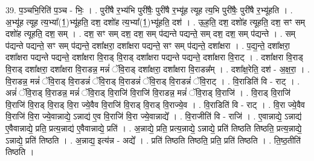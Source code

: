 \documentclass[17pt]{extarticle}
\begin{document}
39. प॒ञ्चभि॒रिति॑ प॒ञ्च - भिः॒ । . पुरी॑षै र॒भ्य॑भि पुरी॑षैः॒ पुरी॑षै र॒भ्यू॑ह त्यूह त्य॒भि पुरी॑षैः॒ पुरी॑षै र॒भ्यू॑हति । . अ॒भ्यू॑ह त्यूह त्य॒भ्या᳚(1॒)भ्यू॑हति॒ दश॒ दशो॑ह त्य॒भ्या᳚(1॒)भ्यू॑हति॒ दश॑ । . ऊ॒ह॒ति॒ दश॒ दशो॑ह त्यूहति॒ दश॒ सꣳ सम् दशो॑ह त्यूहति॒ दश॒ सम् । . दश॒ सꣳ सम् दश॒ दश॒ सम् प॑द्यन्ते पद्यन्ते॒ सम् दश॒ दश॒ सम् प॑द्यन्ते । . सम् प॑द्यन्ते पद्यन्ते॒ सꣳ सम् प॑द्यन्ते॒ दशा᳚क्षरा॒ दशा᳚क्षरा पद्यन्ते॒ सꣳ सम् प॑द्यन्ते॒ दशा᳚क्षरा । . प॒द्य॒न्ते॒ दशा᳚क्षरा॒ दशा᳚क्षरा पद्यन्ते पद्यन्ते॒ दशा᳚क्षरा वि॒राड् वि॒राड् दशा᳚क्षरा पद्यन्ते पद्यन्ते॒ दशा᳚क्षरा वि॒राट् । . दशा᳚क्षरा वि॒राड् वि॒राड् दशा᳚क्षरा॒ दशा᳚क्षरा वि॒राडन्न॒ मन्नं॑ ॅवि॒राड् दशा᳚क्षरा॒ दशा᳚क्षरा वि॒राडन्न᳚म् । . दशा᳚क्ष॒रेति॒ दश॑ - अ॒क्ष॒रा॒ । . वि॒राडन्न॒ मन्नं॑ ॅवि॒राड् वि॒राडन्नं॑ ॅवि॒राड् वि॒राडन्नं॑ ॅवि॒राड् वि॒राडन्नं॑ ॅवि॒राट् । . वि॒राडिति॑ वि - राट् । . अन्नं॑ ॅवि॒राड् वि॒राडन्न॒ मन्नं॑ ॅवि॒राड् वि॒राजि॑ वि॒राजि॑ वि॒राडन्न॒ मन्नं॑ ॅवि॒राड् वि॒राजि॑ । . वि॒राड् वि॒राजि॑ वि॒राजि॑ वि॒राड् वि॒राड् वि॒रा ज्ये॒वैव वि॒राजि॑ वि॒राड् वि॒राड् वि॒राज्ये॒व । . वि॒राडिति॑ वि - राट् । . वि॒रा ज्ये॒वैव वि॒राजि॑ वि॒रा ज्ये॒वान्नाद्ये॒ ऽन्नाद्य॑ ए॒व वि॒राजि॑ वि॒रा ज्ये॒वान्नाद्ये᳚ । . वि॒राजीति॑ वि - राजि॑ । . ए॒वान्नाद्ये॒ ऽन्नाद्य॑ ए॒वैवान्नाद्ये॒ प्रति॒ प्रत्य॒न्नाद्य॑ ए॒वैवान्नाद्ये॒ प्रति॑ । . अ॒न्नाद्ये॒ प्रति॒ प्रत्य॒न्नाद्ये॒ ऽन्नाद्ये॒ प्रति॑ तिष्ठति तिष्ठति॒ प्रत्य॒न्नाद्ये॒ ऽन्नाद्ये॒ प्रति॑ तिष्ठति । . अ॒न्नाद्य॒ इत्य॑न्न - अद्ये᳚ । . प्रति॑ तिष्ठति तिष्ठति॒ प्रति॒ प्रति॑ तिष्ठति । . ति॒ष्ठ॒तीति॑ तिष्ठति । \newline
\pagebreak
{}
\end{document}
